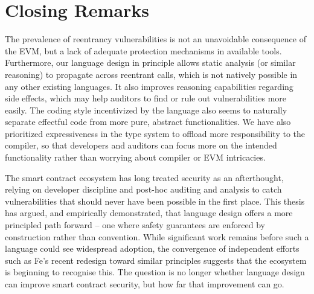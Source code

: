 \section{Closing Remarks}
The prevalence of reentrancy vulnerabilities is not an unavoidable consequence of the EVM, but a lack of adequate protection mechanisms in available tools. Furthermore, our language design in principle allows static analysis (or similar reasoning) to propagate across reentrant calls, which is not natively possible in any other existing languages. It also improves reasoning capabilities regarding side effects, which may help auditors to find or rule out vulnerabilities more easily. The coding style incentivized by the language also seems to naturally separate effectful code from more pure, abstract functionalities. We have also prioritized expressiveness in the type system to offload more responsibility to the compiler, so that developers and auditors can focus more on the intended functionality rather than worrying about compiler or EVM intricacies.
\par
The smart contract ecosystem has long treated security as an afterthought, relying on developer discipline and post-hoc auditing and analysis to catch vulnerabilities that should never have been possible in the first place. This thesis has argued, and empirically demonstrated, that language design offers a more principled path forward -- one where safety guarantees are enforced by construction rather than convention. While significant work remains before such a language could see widespread adoption, the convergence of independent efforts such as Fe's recent redesign toward similar principles suggests that the ecosystem is beginning to recognise this. The question is no longer whether language design can improve smart contract security, but how far that improvement can go.
